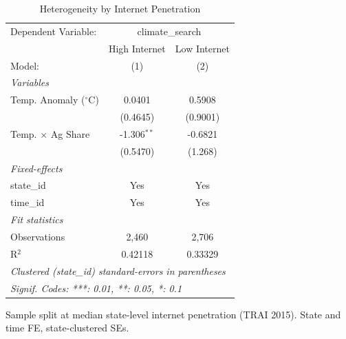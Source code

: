 
\begin{table}[htbp]
   \caption{\label{tab:internet} Heterogeneity by Internet Penetration}
   \centering
   \begin{tabular}{lcc}
      \tabularnewline \midrule \midrule
      Dependent Variable: & \multicolumn{2}{c}{climate\_search}\\
                                 & High Internet & Low Internet \\   
      Model:                     & (1)           & (2)\\  
      \midrule
      \emph{Variables}\\
      Temp. Anomaly ($^\circ$C)  & 0.0401        & 0.5908\\   
                                 & (0.4645)      & (0.9001)\\   
      Temp. $\times$ Ag Share    & -1.306$^{**}$ & -0.6821\\   
                                 & (0.5470)      & (1.268)\\   
      \midrule
      \emph{Fixed-effects}\\
      state\_id                  & Yes           & Yes\\  
      time\_id                   & Yes           & Yes\\  
      \midrule
      \emph{Fit statistics}\\
      Observations               & 2,460         & 2,706\\  
      R$^2$                      & 0.42118       & 0.33329\\  
      \midrule \midrule
      \multicolumn{3}{l}{\emph{Clustered (state\_id) standard-errors in parentheses}}\\
      \multicolumn{3}{l}{\emph{Signif. Codes: ***: 0.01, **: 0.05, *: 0.1}}\\
   \end{tabular}
   
   \par \raggedright 
   Sample split at median state-level internet penetration (TRAI 2015). State and time FE, state-clustered SEs.
\end{table}


